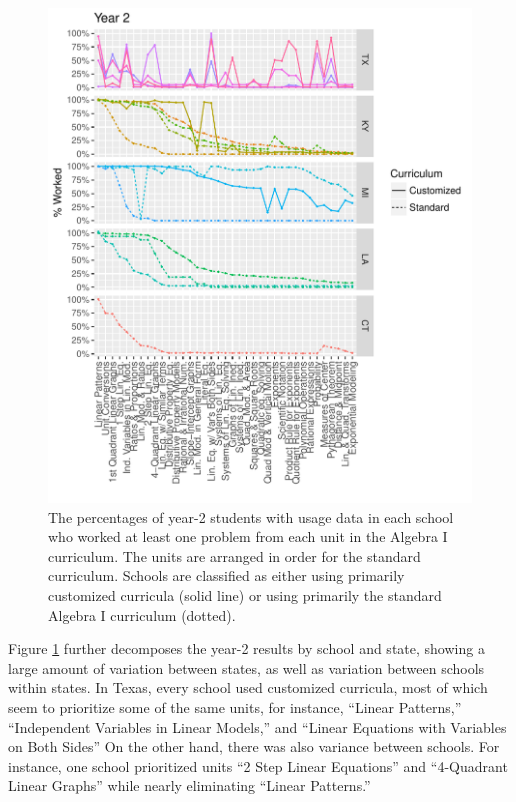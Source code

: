 \documentclass[12pt]{article}\usepackage[]{graphicx}\usepackage[]{color}
\makeatletter
\def\maxwidth{ %
  \ifdim\Gin@nat@width>\linewidth
    \linewidth
  \else
    \Gin@nat@width
  \fi
}
\makeatother
\begin{document}
\begin{figure}
  \centering

\includegraphics[width=\maxwidth]{figure/unitsBySchool-1} 

\caption{The percentages of year-2 students with usage data in each
  school who worked at least one problem from each unit in the Algebra I curriculum. The
  units are arranged in order for the standard curriculum. Schools are
  classified as either using primarily customized curricula (solid
  line) or using primarily the standard Algebra I curriculum (dotted).}
\label{fig:unitsBySchool}
\end{figure}

Figure \ref{fig:unitsBySchool} further decomposes the year-2 results
by school and state, showing a large amount of variation between
states, as well as variation between schools within states.
In Texas, every school used customized curricula, most of which seem to
prioritize some of the same units, for instance, ``Linear Patterns,''
``Independent Variables in Linear Models,'' and
``Linear Equations with Variables on Both Sides''
On the other hand, there was also variance between schools.
For instance, one school prioritized units ``2 Step Linear Equations''
and ``4-Quadrant Linear Graphs'' while nearly eliminating ``Linear Patterns.''
\end{document}

